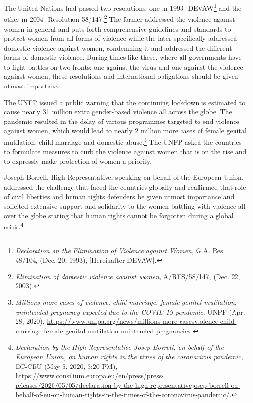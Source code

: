 \begin{multicols}{2}
\noi
The United Nations had passed two resolutions: one in 1993- DEVAW\footnote{\textit{Declaration on the Elimination of Violence against Women}, G.A. Res. 48/104, (Dec. 20, 1993), [Hereinafter
DEVAW].} and the other in
2004- Resolution 58/147.\footnote{\textit{Elimination of domestic violence against women}, A/RES/58/147, (Dec. 22, 2003).} The former addressed the violence against women in general and
puts forth comprehensive guidelines and standards to protect women from all forms of
violence while the later specifically addressed domestic violence against women,
condemning it and addressed the different forms of domestic violence. During times like
these, where all governments have to fight battles on two fronts: one against the virus and one
against the violence against women, these resolutions and international obligations should be
given utmost importance.



\noi
The UNFP issued a public warning that the continuing lockdown is estimated to cause nearly
31 million extra gender-based violence all across the globe. The pandemic resulted in the
delay of various programmes targeted to end violence against women, which would lead to
nearly 2 million more cases of female genital mutilation, child marriage and domestic
abuse.\footnote{\textit{Millions more cases of violence, child marriage, female genital mutilation, unintended pregnancy expected
due to the COVID-19 pandemic}, UNPF (Apr. 28, 2020), \url{https://www.unfpa.org/news/millions-more-casesviolence-child-marriage-female-genital-mutilation-unintended-pregnancies.}} The UNFP asked the countries to formulate measures to curb the violence against
women that is on the rise and to expressly make protection of women a priority.


\noi
Joseph Borrell, High Representative, speaking on behalf of the European Union, addressed
the challenge that faced the countries globally and reaffirmed that role of civil liberties and
human rights defenders be given utmost importance and solicited extensive support and
solidarity to the women battling with violence all over the globe stating that human rights
cannot be forgotten during a global crisis.\footnote{\textit{Declaration by the High Representative Josep Borrell, on behalf of the European Union, on human rights in
the times of the coronavirus pandemic}, EC-CEU (May 5, 2020, 3:20 PM),
\url{https://www.consilium.europa.eu/en/press/press-releases/2020/05/05/declaration-by-the-high-representativejosep-borrell-on-behalf-of-eu-on-human-rights-in-the-times-of-the-coronavirus-pandemic/.}}


\end{multicols}
